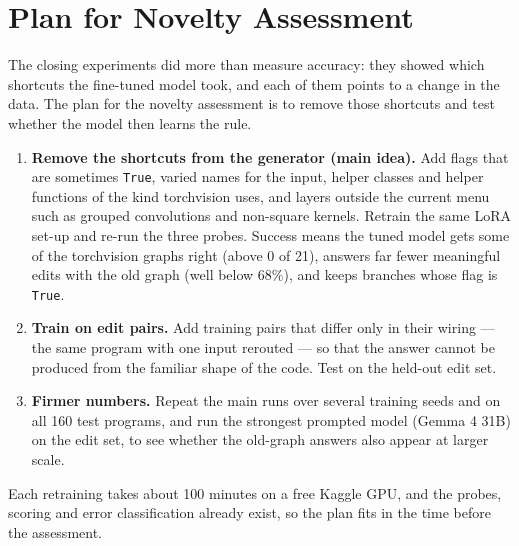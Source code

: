 \documentclass[twoside,english]{article}
\begin{document}
\FloatBarrier
\section{Plan for Novelty Assessment} \label{sec:Plan for Novelty Assessment}
The closing experiments did more than measure accuracy: they showed which shortcuts the
fine-tuned model took, and each of them points to a change in the data. The plan for the novelty
assessment is to remove those shortcuts and test whether the model then learns the rule.
\begin{enumerate}
	\item \textbf{Remove the shortcuts from the generator (main idea).} Add flags that are sometimes
	\texttt{True}, varied names for the input, helper classes and helper functions of the kind
	torchvision uses, and layers outside the current menu such as grouped convolutions and non-square
	kernels. Retrain the same LoRA set-up and re-run the three probes. Success means the tuned model
	gets some of the torchvision graphs right (above 0 of 21), answers far fewer meaningful edits with
	the old graph (well below 68\%), and keeps branches whose flag is \texttt{True}.
	\item \textbf{Train on edit pairs.} Add training pairs that differ only in their wiring --- the same
	program with one input rerouted --- so that the answer cannot be produced from the familiar shape
	of the code. Test on the held-out edit set.
	\item \textbf{Firmer numbers.} Repeat the main runs over several training seeds and on all 160 test
	programs, and run the strongest prompted model (Gemma 4 31B) on the edit set, to see whether the
	old-graph answers also appear at larger scale.
\end{enumerate}
Each retraining takes about 100 minutes on a free Kaggle GPU, and the probes, scoring and error
classification already exist, so the plan fits in the time before the assessment.
\end{document}
